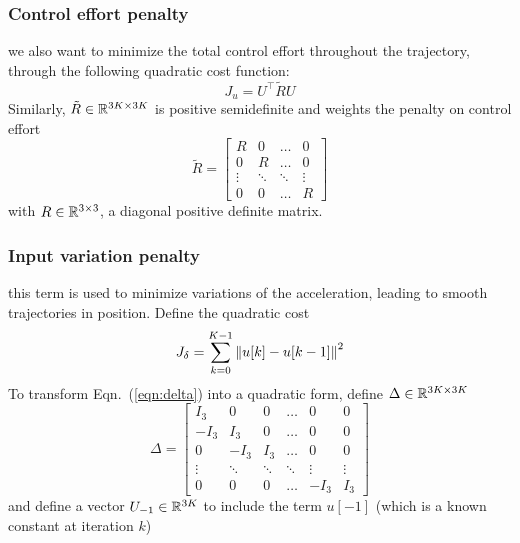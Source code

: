 \subsubsection{Control effort penalty}
we also want to minimize the total control effort throughout the trajectory, through the following quadratic cost function:
\begin{equation}
\label{eqn:input}
J_u = U^\top \tilde{R} U 
\end{equation}
Similarly, $\tilde{R} \in {\mathbb R}^{3K \times 3K} $ is positive semidefinite and weights the penalty on control effort
\begin{equation}
\tilde{R} = \begin{bmatrix}
R & 0& \ldots & 0 \\
0 & R & \ldots & 0 \\
\vdots & \ddots & \ddots & \vdots \\
0 & 0 & \ldots & R
\end{bmatrix}
\end{equation}
with $R \in {\mathbb R}^{3 \times 3}$, a diagonal positive definite matrix.

\subsubsection{Input variation penalty}
this term is used to minimize variations of the acceleration, leading to smooth trajectories in position. Define the quadratic cost
\begin{equation}
\label{eqn:delta}
J_\delta = \sum_{k=0}^{K-1}\left\Vert u[k]-u[k-1]\right\Vert^2
\end{equation}
To transform Eqn.~(\ref{eqn:delta}) into a quadratic form, define $\Delta \in {\mathbb R}^{3K \times 3K}$
\begin{equation}
\Delta = \begin{bmatrix}
I_3 & 0 & 0 & \ldots & 0 & 0 \\
-I_3 & I_3 & 0 & \dots & 0 & 0 \\
0 & -I_3 & I_3 & \ldots & 0 & 0 \\
\vdots & \ddots & \ddots & \ddots & \vdots & \vdots\\
0& 0 & 0 & \ldots & -I_3 & I_3
\end{bmatrix}
\end{equation}
and define a vector $U_{-1} \in {\mathbb R}^{3K}$ to include the term $u[-1]$ (which is a known constant at iteration $k$)

